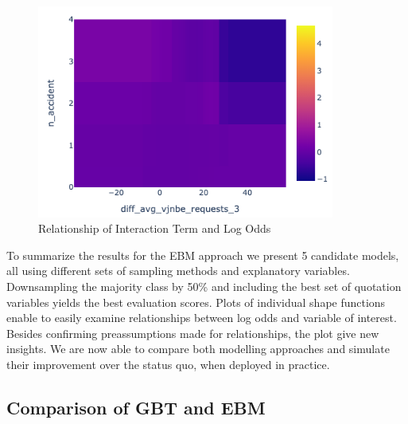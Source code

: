 \documentclass[12pt,titlepage]{article}
\begin{document}
\begin{figure}[H]
    \centerline{\includegraphics[height=7cm]{shape_2dim.png}}
    \caption{Relationship of Interaction Term and Log Odds}
    \label{fig:shape2dim}
\end{figure}
\noindent
To summarize the results for the EBM approach we present 5 candidate models, all using different sets of sampling methods and explanatory variables. Downsampling the majority class by 50\% and including the best set of quotation variables yields the best evaluation scores. Plots of individual shape functions enable to easily examine relationships between log odds and variable of interest. Besides confirming preassumptions made for relationships, the plot give new insights. We are now able to compare both modelling approaches and simulate their improvement over the status quo, when deployed in practice. \\

\subsection{Comparison of GBT and EBM}
\end{document}
